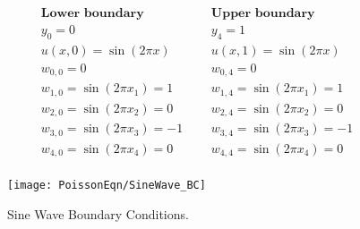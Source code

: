 \[
\begin{array}{lcl}
\textbf{Lower boundary}&\ \ \ & \textbf{Upper boundary}\\ 
 y_0=0&\ \ \ & y_4=1 \\
 u(x,0)=\sin(2\pi x)&\ \ \ & u(x,1)=\sin(2\pi x) \\

 w_{0,0}=0 & \ \ \ & w_{0,4}=0\\ 

w_{1,0}=\sin(2\pi x_1) =1  & \ \ \ & w_{1,4}=\sin(2\pi x_1) =1 \\


w_{2,0}=\sin(2\pi x_2) =0  & \ \ \ & w_{2,4}=\sin(2\pi x_2) =0 \\


w_{3,0}=\sin(2\pi x_3) =-1  & \ \ \ & w_{3,4}=\sin(2\pi x_3) =-1 \\


w_{4,0}=\sin(2\pi x_4) =0  & \ \ \ & w_{4,4}=\sin(2\pi x_4) =0 \\

\end{array}
\]
\begin{figure}[H]
  \caption{Sine Wave Boundary Conditions.}\label{Sine_waveBC}
  \centering
    \texttt{[image: PoissonEqn/SineWave\_BC]}
\end{figure}

